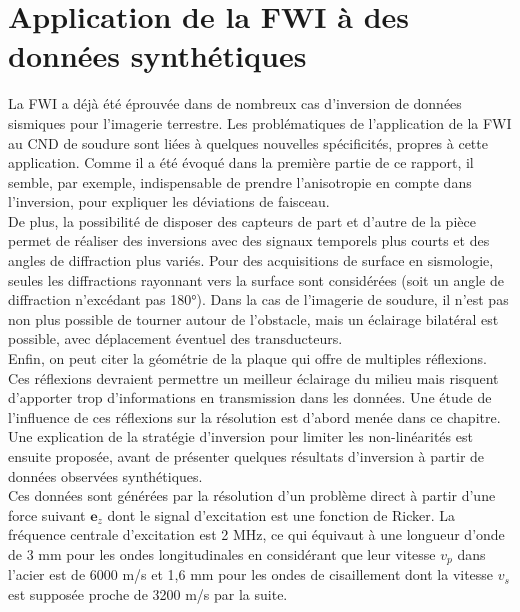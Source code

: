 \chapter{Application de la FWI à des données synthétiques \label{applications}}

La FWI a déjà été éprouvée dans de nombreux cas d'inversion de données sismiques pour l'imagerie terrestre. Les problématiques de l'application de la FWI au CND de soudure sont liées à quelques nouvelles spécificités, propres à cette application. Comme il a été évoqué dans la première partie de ce rapport, il semble, par exemple, indispensable de prendre l'anisotropie en compte dans l'inversion, pour expliquer les déviations de faisceau.\\

De plus, la possibilité de disposer des capteurs de part et d'autre de la pièce permet de réaliser des inversions avec des signaux temporels plus courts et des angles de diffraction plus variés. Pour des acquisitions de surface en sismologie, seules les diffractions rayonnant vers la surface sont considérées (soit un angle de diffraction n'excédant pas 180°). Dans la cas de l'imagerie de soudure, il n'est pas non plus possible de tourner autour de l'obstacle, mais un éclairage bilatéral est possible, avec déplacement éventuel des transducteurs.\\

Enfin, on peut citer la géométrie de la plaque qui offre de multiples réflexions. Ces réflexions devraient permettre un meilleur éclairage du milieu mais risquent d'apporter trop d'informations en transmission dans les données. Une étude de l'influence de ces réflexions sur la résolution est d'abord menée dans ce chapitre. Une explication de la stratégie d'inversion pour limiter les non-linéarités est ensuite proposée, avant de présenter quelques résultats d'inversion à partir de données observées synthétiques.\\

Ces données sont générées par la résolution d'un problème direct à partir d'une force suivant $\bm{e}_{z}$ dont le signal d'excitation est une fonction de Ricker. La fréquence centrale d'excitation est 2 MHz,  ce qui équivaut à une longueur d'onde de 3 mm pour les ondes longitudinales en considérant que leur vitesse $v_{p}$ dans l'acier est de 6000 m/s et 1,6 mm pour les ondes de cisaillement dont la vitesse $v_{s}$ est supposée proche de 3200 m/s par la suite.

